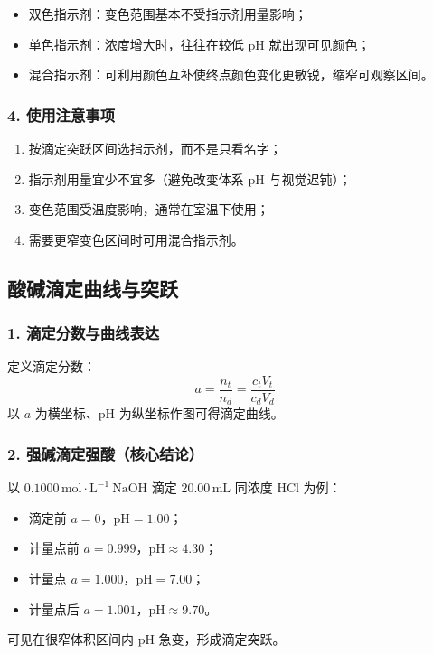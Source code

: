 \documentclass[12pt,a4paper]{article}
\numberwithin{equation}{section}
\begin{document}
\begin{itemize}
    \item 双色指示剂：变色范围基本不受指示剂用量影响；
    \item 单色指示剂：浓度增大时，往往在较低 pH 就出现可见颜色；
    \item 混合指示剂：可利用颜色互补使终点颜色变化更敏锐，缩窄可观察区间。
\end{itemize}

\subsubsection{4. 使用注意事项}
\begin{enumerate}
    \item 按滴定突跃区间选指示剂，而不是只看名字；
    \item 指示剂用量宜少不宜多（避免改变体系 pH 与视觉迟钝）；
    \item 变色范围受温度影响，通常在室温下使用；
    \item 需要更窄变色区间时可用混合指示剂。
\end{enumerate}

\subsection{酸碱滴定曲线与突跃}

\subsubsection{1. 滴定分数与曲线表达}
定义滴定分数：
\begin{equation}
a=\frac{n_t}{n_d}=\frac{c_tV_t}{c_dV_d}
\end{equation}
以 $a$ 为横坐标、pH 为纵坐标作图可得滴定曲线。

\subsubsection{2. 强碱滴定强酸（核心结论）}
以 $0.1000\,\mathrm{mol\cdot L^{-1}}\ \mathrm{NaOH}$ 滴定
$20.00\,\mathrm{mL}$ 同浓度 $\mathrm{HCl}$ 为例：
\begin{itemize}
    \item 滴定前 $a=0$，$\mathrm{pH}=1.00$；
    \item 计量点前 $a=0.999$，$\mathrm{pH}\approx 4.30$；
    \item 计量点 $a=1.000$，$\mathrm{pH}=7.00$；
    \item 计量点后 $a=1.001$，$\mathrm{pH}\approx 9.70$。
\end{itemize}
可见在很窄体积区间内 pH 急变，形成滴定突跃。
\end{document}
